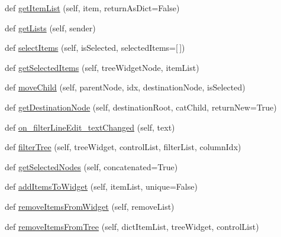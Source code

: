 \begin{DoxyCompactItemize}
\item 
def \mbox{\hyperlink{class_dsg_tools_1_1_custom_widgets_1_1custom_table_selector_1_1_custom_table_selector_a97292df493f03e0002c37aa4137955ae}{get\+Item\+List}} (self, item, return\+As\+Dict=False)
\item 
def \mbox{\hyperlink{class_dsg_tools_1_1_custom_widgets_1_1custom_table_selector_1_1_custom_table_selector_a1bd2f667614af00a55c8f4c00d4934a3}{get\+Lists}} (self, sender)
\item 
def \mbox{\hyperlink{class_dsg_tools_1_1_custom_widgets_1_1custom_table_selector_1_1_custom_table_selector_a680a7f73d6d12bb822954f376f7c16e5}{select\+Items}} (self, is\+Selected, selected\+Items=\mbox{[}$\,$\mbox{]})
\item 
def \mbox{\hyperlink{class_dsg_tools_1_1_custom_widgets_1_1custom_table_selector_1_1_custom_table_selector_ad9f3c101290cad906f084c6568afedf5}{get\+Selected\+Items}} (self, tree\+Widget\+Node, item\+List)
\item 
def \mbox{\hyperlink{class_dsg_tools_1_1_custom_widgets_1_1custom_table_selector_1_1_custom_table_selector_a41662c4764dcefb9e1adf6e70ca30f4f}{move\+Child}} (self, parent\+Node, idx, destination\+Node, is\+Selected)
\item 
def \mbox{\hyperlink{class_dsg_tools_1_1_custom_widgets_1_1custom_table_selector_1_1_custom_table_selector_a5068e2812f9a69da059f578283dabfe9}{get\+Destination\+Node}} (self, destination\+Root, cat\+Child, return\+New=True)
\item 
def \mbox{\hyperlink{class_dsg_tools_1_1_custom_widgets_1_1custom_table_selector_1_1_custom_table_selector_a2990b2a9df0c5cf1e77c928be02e01c8}{on\+\_\+filter\+Line\+Edit\+\_\+text\+Changed}} (self, text)
\item 
def \mbox{\hyperlink{class_dsg_tools_1_1_custom_widgets_1_1custom_table_selector_1_1_custom_table_selector_af58cd7feefe930b6bb5a2e669e79c6a3}{filter\+Tree}} (self, tree\+Widget, control\+List, filter\+List, column\+Idx)
\item 
def \mbox{\hyperlink{class_dsg_tools_1_1_custom_widgets_1_1custom_table_selector_1_1_custom_table_selector_af47b3d8d56cf04c461fa9811ede42645}{get\+Selected\+Nodes}} (self, concatenated=True)
\item 
def \mbox{\hyperlink{class_dsg_tools_1_1_custom_widgets_1_1custom_table_selector_1_1_custom_table_selector_a58bd65d3468ed434e497e63fc2677ffa}{add\+Items\+To\+Widget}} (self, item\+List, unique=False)
\item 
def \mbox{\hyperlink{class_dsg_tools_1_1_custom_widgets_1_1custom_table_selector_1_1_custom_table_selector_aeb271b962b6d72639c03fe4887cc73f9}{remove\+Items\+From\+Widget}} (self, remove\+List)
\item 
def \mbox{\hyperlink{class_dsg_tools_1_1_custom_widgets_1_1custom_table_selector_1_1_custom_table_selector_ae65f65b45d6ed93537e89c028313aef5}{remove\+Items\+From\+Tree}} (self, dict\+Item\+List, tree\+Widget, control\+List)
\end{DoxyCompactItemize}
